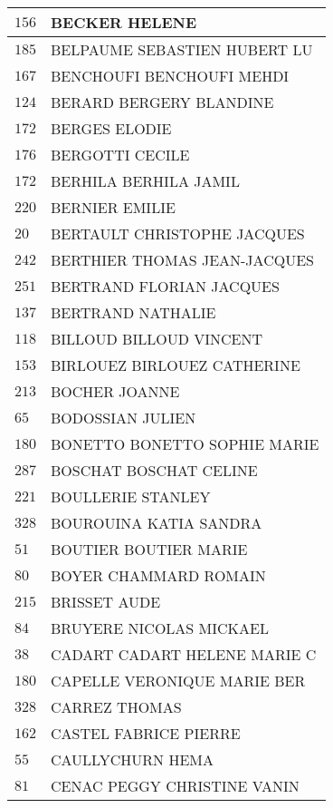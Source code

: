 \begin{xltabular}{\linewidth}{|l|X|}
    \hline
    $156$ & BECKER HELENE \\
    \hline
    $185$ & BELPAUME SEBASTIEN HUBERT LU \\
    \hline
    $167$ & BENCHOUFI BENCHOUFI MEHDI \\
    \hline
    $124$ & BERARD BERGERY BLANDINE \\
    \hline
    $172$ & BERGES ELODIE \\
    \hline
    $176$ & BERGOTTI CECILE \\
    \hline
    $172$ & BERHILA BERHILA JAMIL \\
    \hline
    $220$ & BERNIER EMILIE \\
    \hline
    $20$ & BERTAULT CHRISTOPHE JACQUES \\
    \hline
    $242$ & BERTHIER THOMAS JEAN-JACQUES \\
    \hline
    $251$ & BERTRAND FLORIAN JACQUES \\
    \hline
    $137$ & BERTRAND NATHALIE \\
    \hline
    $118$ & BILLOUD BILLOUD VINCENT \\
    \hline
    $153$ & BIRLOUEZ BIRLOUEZ CATHERINE \\
    \hline
    $213$ & BOCHER JOANNE \\
    \hline
    $65$ & BODOSSIAN JULIEN \\
    \hline
    $180$ & BONETTO BONETTO SOPHIE MARIE \\
    \hline
    $287$ & BOSCHAT BOSCHAT CELINE \\
    \hline
    $221$ & BOULLERIE STANLEY \\
    \hline
    $328$ & BOUROUINA KATIA SANDRA \\
    \hline
    $51$ & BOUTIER BOUTIER MARIE \\
    \hline
    $80$ & BOYER CHAMMARD ROMAIN \\
    \hline
    $215$ & BRISSET AUDE \\
    \hline
    $84$ & BRUYERE NICOLAS MICKAEL \\
    \hline
    $38$ & CADART CADART HELENE MARIE C \\
    \hline
    $180$ & CAPELLE VERONIQUE MARIE BER \\
    \hline
    $328$ & CARREZ THOMAS \\
    \hline
    $162$ & CASTEL FABRICE PIERRE \\
    \hline
    $55$ & CAULLYCHURN HEMA \\
    \hline
    $81$ & CENAC PEGGY CHRISTINE VANIN \\

\end{xltabular}
